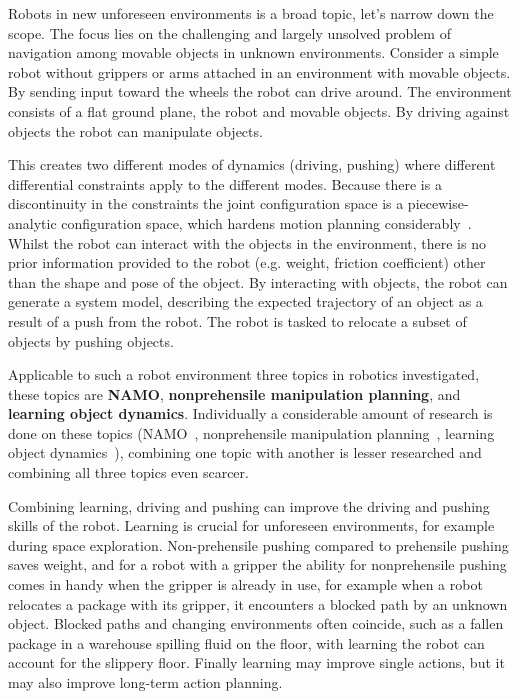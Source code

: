 Robots in new unforeseen environments is a broad topic, let's narrow down the scope. The focus lies on the challenging and largely unsolved problem of navigation among movable objects in unknown environments. Consider a simple robot without grippers or arms attached in an environment with movable objects. By sending input toward the wheels the robot can drive around. The environment consists of a flat ground plane, the robot and movable objects. By driving against objects the robot can manipulate objects.\bs 

This creates two different modes of dynamics (driving,  pushing) where different differential constraints apply to the different modes. Because there is a discontinuity in the constraints the joint configuration space is a piecewise-analytic configuration space, which hardens motion planning considerably~\cite{vega-brown_asymptotically_2020}. Whilst the robot can interact with the objects in the environment, there is no prior information provided to the robot (e.g. weight, friction coefficient) other than the shape and pose of the object. By interacting with objects, the robot can generate a system model, describing the expected trajectory of an object as a result of a push from the robot. The robot is tasked to relocate a subset of objects by pushing objects. \bs

Applicable to such a robot environment three topics in robotics investigated, these topics are \textbf{\ac{NAMO}}, \textbf{nonprehensile manipulation planning}, and \textbf{learning object dynamics}. Individually a considerable amount of research is done on these topics (\ac{NAMO}~\cite{wang_affordancebased_2020,lavalle_planning_2006,elbanhawi_samplingbased_2014,kingston_samplingbased_2018,chen_fast_2018,ellis_navigation_2022}, nonprehensile manipulation planning~\cite{arruda_uncertainty_2017,mericli_pushmanipulation_2015,toussaint_sequenceofconstraints_2022,stuber_let_2020,stuber_featurebased_2018,bauza_dataefficient_2018}, learning object dynamics~\cite{seegmiller_vehicle_2013,cong_selfadapting_2020}), combining one topic with another is lesser researched and combining all three topics even scarcer.\bs

Combining learning, driving and pushing can improve the driving and pushing skills of the robot. Learning is crucial for unforeseen environments, for example during space exploration. Non-prehensile pushing compared to prehensile pushing saves weight, and for a robot with a gripper the ability for nonprehensile pushing comes in handy when the gripper is already in use, for example when a robot relocates a package with its gripper, it encounters a blocked path by an unknown object. Blocked paths and changing environments often coincide, such as a fallen package in a warehouse spilling fluid on the floor, with learning the robot can account for the slippery floor. Finally learning may improve single actions, but it may also improve long-term action planning.\bs

